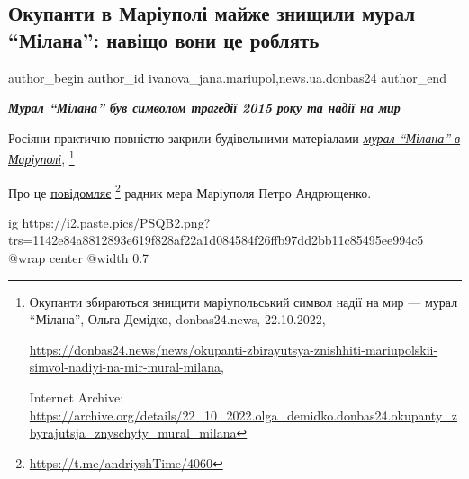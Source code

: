  
 
 
 
 
 
\subsection{Окупанти в Маріуполі майже знищили мурал \enquote{Мілана}: навіщо вони це роблять}
\label{sec:01_11_2022.stz.news.ua.donbas24.2.okupanty_mrpl_majzhe_znyschyly_mural_milana}
 
\ifcmt
 author_begin
   author_id ivanova_jana.mariupol,news.ua.donbas24
 author_end
\fi

\begin{center}
  \em\bfseries\Large
Мурал \enquote{Мілана} був символом трагедії 2015 року та надії на мир
\end{center}

Росіяни практично повністю закрили будівельними матеріалами \href{https://donbas24.news/news/okupanti-zbirayutsya-znishhiti-mariupolskii-simvol-nadiyi-na-mir-mural-milana}{\emph{мурал \enquote{Мілана} в
Маріуполі}},%
\footnote{Окупанти збираються знищити маріупольський символ надії на мир — мурал \enquote{Мілана}, Ольга Демідко, donbas24.news, 22.10.2022, \par%
\url{https://donbas24.news/news/okupanti-zbirayutsya-znishhiti-mariupolskii-simvol-nadiyi-na-mir-mural-milana}, \par%
Internet Archive: \url{https://archive.org/details/22_10_2022.olga_demidko.donbas24.okupanty_zbyrajutsja_znyschyty_mural_milana}%
}

Про це \href{https://t.me/andriyshTime/4060}{повідомляє}%
\footnote{\url{https://t.me/andriyshTime/4060}} радник мера Маріуполя Петро Андрющенко.

\ifcmt
  ig https://i2.paste.pics/PSQB2.png?trs=1142e84a8812893e619f828af22a1d084584f26ffb97dd2bb11c85495ee994c5
  @wrap center
  @width 0.7
\fi

